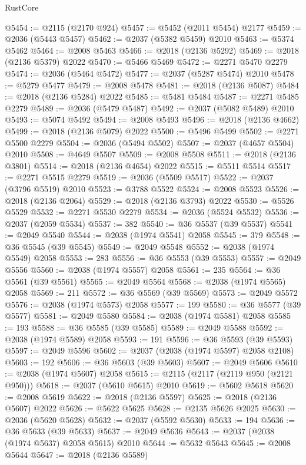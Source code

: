 \begin{lexlean}{RustCore}
\begin{coremodule}
@5454 := @2115 (@2170 @924)
@5457 := @5452 (@2011 @5454) @2177
@5459 := @2036 (@5443 @5457)
@5462 := @2037 (@5382 @5459) @2010
@5463 := @5374 @5462
@5464 := @2008 @5463
@5466 := @2018 (@2136 @5292)
@5469 := @2018 (@2136 @5379) @2022
@5470 := @5466 @5469
@5472 := @2271 @5470 @2279
@5474 := @2036 (@5464 @5472)
@5477 := @2037 (@5287 @5474) @2010
@5478 := @5279 @5477
@5479 := @2008 @5478
@5481 := @2018 (@2136 @5087)
@5484 := @2018 (@2136 @5284) @2022
@5485 := @5481 @5484
@5487 := @2271 @5485 @2279
@5489 := @2036 (@5479 @5487)
@5492 := @2037 (@5082 @5489) @2010
@5493 := @5074 @5492
@5494 := @2008 @5493
@5496 := @2018 (@2136 @4662)
@5499 := @2018 (@2136 @5079) @2022
@5500 := @5496 @5499
@5502 := @2271 @5500 @2279
@5504 := @2036 (@5494 @5502)
@5507 := @2037 (@4657 @5504) @2010
@5508 := @4649 @5507
@5509 := @2008 @5508
@5511 := @2018 (@2136 @3801)
@5514 := @2018 (@2136 @4654) @2022
@5515 := @5511 @5514
@5517 := @2271 @5515 @2279
@5519 := @2036 (@5509 @5517)
@5522 := @2037 (@3796 @5519) @2010
@5523 := @3788 @5522
@5524 := @2008 @5523
@5526 := @2018 (@2136 @2064)
@5529 := @2018 (@2136 @3793) @2022
@5530 := @5526 @5529
@5532 := @2271 @5530 @2279
@5534 := @2036 (@5524 @5532)
@5536 := @2037 (@2059 @5534)
@5537 := 382
@5540 := @36 @5537 (@39 @5537)
@5541 := @2049 @5540
@5544 := @2038 (@1974 @5541) @2058
@5545 := 379
@5548 := @36 @5545 (@39 @5545)
@5549 := @2049 @5548
@5552 := @2038 (@1974 @5549) @2058
@5553 := 283
@5556 := @36 @5553 (@39 @5553)
@5557 := @2049 @5556
@5560 := @2038 (@1974 @5557) @2058
@5561 := 235
@5564 := @36 @5561 (@39 @5561)
@5565 := @2049 @5564
@5568 := @2038 (@1974 @5565) @2058
@5569 := 211
@5572 := @36 @5569 (@39 @5569)
@5573 := @2049 @5572
@5576 := @2038 (@1974 @5573) @2058
@5577 := 199
@5580 := @36 @5577 (@39 @5577)
@5581 := @2049 @5580
@5584 := @2038 (@1974 @5581) @2058
@5585 := 193
@5588 := @36 @5585 (@39 @5585)
@5589 := @2049 @5588
@5592 := @2038 (@1974 @5589) @2058
@5593 := 191
@5596 := @36 @5593 (@39 @5593)
@5597 := @2049 @5596
@5602 := @2037 (@2038 (@1974 @5597) @2058 @2108)
@5603 := 192
@5606 := @36 @5603 (@39 @5603)
@5607 := @2049 @5606
@5610 := @2038 (@1974 @5607) @2058
@5615 := @2115 (@2117 (@2119 @950 (@2121 @950)))
@5618 := @2037 (@5610 @5615) @2010
@5619 := @5602 @5618
@5620 := @2008 @5619
@5622 := @2018 (@2136 @5597)
@5625 := @2018 (@2136 @5607) @2022
@5626 := @5622 @5625
@5628 := @2135 @5626 @2025
@5630 := @2036 (@5620 @5628)
@5632 := @2037 (@5592 @5630)
@5633 := 194
@5636 := @36 @5633 (@39 @5633)
@5637 := @2049 @5636
@5643 := @2037 (@2038 (@1974 @5637) @2058 @5615) @2010
@5644 := @5632 @5643
@5645 := @2008 @5644
@5647 := @2018 (@2136 @5589)

\end{coremodule}
\end{lexlean}
